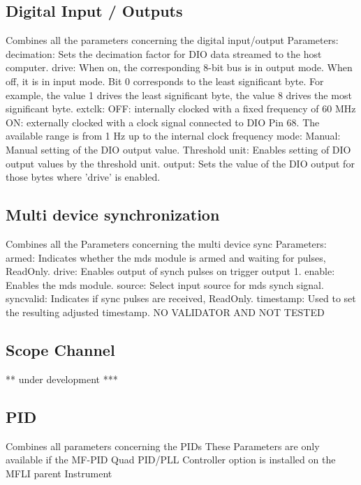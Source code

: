 \documentclass[11pt]{article} %
\begin{document}
\subsection{Digital Input / Outputs}
    Combines all the parameters concerning the digital input/output
    Parameters:
            decimation: Sets the decimation factor for DIO data streamed to the 
                host computer.
            drive: When on, the corresponding 8-bit bus is in output mode. 
                When off, it is in input mode. Bit 0 corresponds to the least 
                significant byte. For example, the value 1 drives the least significant
                byte, the value 8 drives the most significant byte.
            extclk: OFF: internally clocked with a fixed frequency of 60 MHz
                    ON:  externally clocked with a clock signal connected to DIO Pin 68.
                         The available range is from 1 Hz up to the internal clock
                         frequency
            mode: Manual: Manual setting of the DIO output value.
                  Threshold unit: Enables setting of DIO output values by the 
                      threshold unit.
            output: Sets the value of the DIO output for those bytes where 'drive'
                is enabled.


\subsection{Multi device synchronization}
    Combines all the Parameters concerning the multi device sync
    Parameters:
            armed: Indicates whether the mds module is armed and waiting
                   for pulses, ReadOnly.
            drive: Enables output of synch pulses on trigger output 1.
            enable: Enables the mds module.
            source: Select input source for mds synch signal.
            syncvalid: Indicates if sync pulses are received, ReadOnly.
            timestamp: Used to set the resulting adjusted timestamp.
NO VALIDATOR AND NOT TESTED


\subsection{Scope Channel}
        ** under development ***


\subsection{PID}
    Combines all parameters concerning the PIDs
    These Parameters are only available if the MF-PID Quad PID/PLL Controller 
    option is installed on the MFLI parent Instrument
\end{document}

